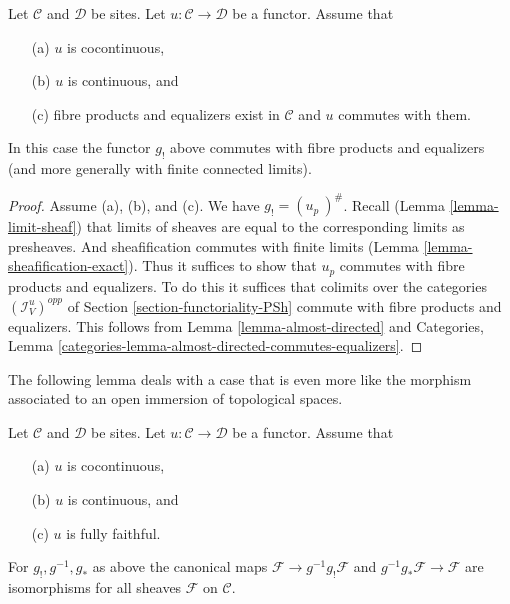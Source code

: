 \begin{lemma}
\label{lemma-preserve-equalizers}
Let $\mathcal{C}$ and $\mathcal{D}$ be sites.
Let $u : \mathcal{C} \to \mathcal{D}$ be a functor.
Assume that
\begin{enumerate}
\item[(a)] $u$ is cocontinuous,
\item[(b)] $u$ is continuous, and
\item[(c)] fibre products and equalizers exist in $\mathcal{C}$ and
$u$ commutes with them.
\end{enumerate}
In this case the functor $g_!$ above commutes with fibre products and
equalizers (and more generally with finite connected limits).
\end{lemma}

\begin{proof}
Assume (a), (b), and (c).
We have $g_! = (u_p\ )^\#$. Recall (Lemma \ref{lemma-limit-sheaf}) that
limits of sheaves are equal to the corresponding limits as presheaves.
And sheafification commutes with finite limits
(Lemma \ref{lemma-sheafification-exact}). Thus it
suffices to show that $u_p$ commutes with fibre products and equalizers.
To do this it suffices that colimits over the categories
$(\mathcal{I}_V^u)^{opp}$ of
Section \ref{section-functoriality-PSh}
commute with fibre products and equalizers. This follows
from
Lemma \ref{lemma-almost-directed}
and
Categories, Lemma \ref{categories-lemma-almost-directed-commutes-equalizers}.
\end{proof}

\noindent
The following lemma deals with a case that is even more like
the morphism associated to an open immersion of topological spaces.

\begin{lemma}
\label{lemma-back-and-forth}
Let $\mathcal{C}$ and $\mathcal{D}$ be sites.
Let $u : \mathcal{C} \to \mathcal{D}$ be a functor.
Assume that
\begin{enumerate}
\item[(a)] $u$ is cocontinuous,
\item[(b)] $u$ is continuous, and
\item[(c)] $u$ is fully faithful.
\end{enumerate}
For $g_!, g^{-1}, g_*$ as above
the canonical maps $\mathcal{F} \to g^{-1}g_!\mathcal{F}$
and $g^{-1}g_*\mathcal{F} \to \mathcal{F}$ are isomorphisms
for all sheaves $\mathcal{F}$ on $\mathcal{C}$.
\end{lemma}

